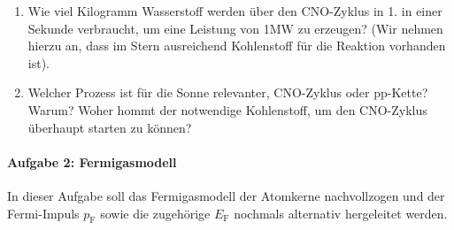 \documentclass[11pt,a4paper]{scrartcl}
\begin{document}
\begin{enumerate}
            \item
                Wie viel Kilogramm Wasserstoff werden über den CNO-Zyklus in 1. in einer Sekunde verbraucht, um eine Leistung von 1MW zu erzeugen? (Wir nehmen hierzu an, dass im Stern ausreichend Kohlenstoff für die Reaktion vorhanden ist).

            \item
                Welcher Prozess ist für die Sonne relevanter, CNO-Zyklus oder pp-Kette? Warum? Woher hommt der notwendige Kohlenstoff, um den CNO-Zyklus überhaupt starten zu können?
        \end{enumerate}

    \paragraph{Aufgabe 2: Fermigasmodell}

        In dieser Aufgabe soll das Fermigasmodell der Atomkerne nachvollzogen und der Fermi-Impuls $p_\text{F}$ sowie die zugehörige $E_\text{F}$ nochmals alternativ hergeleitet werden.
\end{document}
